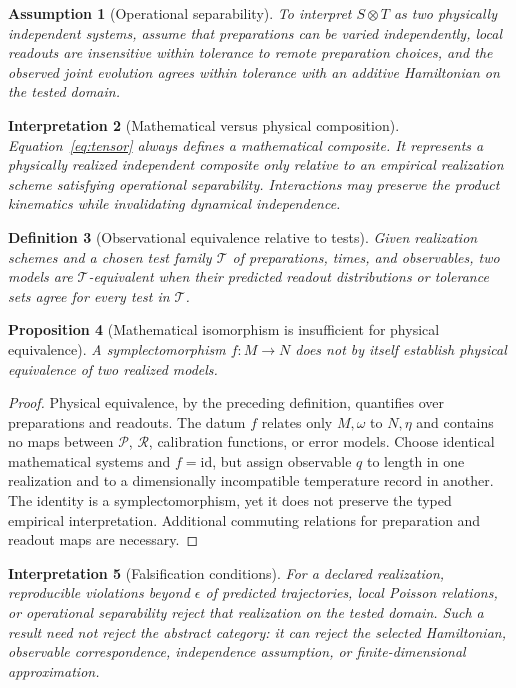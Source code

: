\documentclass[11pt]{article}
\newtheorem{definition}{Definition}[section]
\newtheorem{assumption}[definition]{Assumption}
\newtheorem{proposition}[definition]{Proposition}
\newtheorem{interpretation}[definition]{Interpretation}
\newcommand{\id}{\mathrm{id}}
\begin{document}
\begin{assumption}[Operational separability]
To interpret $S\otimes T$ as two physically independent systems, assume that preparations can be varied independently, local readouts are insensitive within tolerance to remote preparation choices, and the observed joint evolution agrees within tolerance with an additive Hamiltonian on the tested domain.
\end{assumption}

\begin{interpretation}[Mathematical versus physical composition]
Equation~\eqref{eq:tensor} always defines a mathematical composite.  It represents a physically realized independent composite only relative to an empirical realization scheme satisfying operational separability.  Interactions may preserve the product kinematics while invalidating dynamical independence.
\end{interpretation}

\begin{definition}[Observational equivalence relative to tests]
Given realization schemes and a chosen test family $\mathcal T$ of preparations, times, and observables, two models are $\mathcal T$-equivalent when their predicted readout distributions or tolerance sets agree for every test in $\mathcal T$.
\end{definition}

\begin{proposition}[Mathematical isomorphism is insufficient for physical equivalence]
A symplectomorphism $f:M\to N$ does not by itself establish physical equivalence of two realized models.
\end{proposition}
\begin{proof}
Physical equivalence, by the preceding definition, quantifies over preparations and readouts.  The datum $f$ relates only $M,\omega$ to $N,\eta$ and contains no maps between $\mathcal P$, $\mathcal R$, calibration functions, or error models.  Choose identical mathematical systems and $f=\id$, but assign observable $q$ to length in one realization and to a dimensionally incompatible temperature record in another.  The identity is a symplectomorphism, yet it does not preserve the typed empirical interpretation.  Additional commuting relations for preparation and readout maps are necessary.
\end{proof}

\begin{interpretation}[Falsification conditions]
For a declared realization, reproducible violations beyond $\epsilon$ of predicted trajectories, local Poisson relations, or operational separability reject that realization on the tested domain.  Such a result need not reject the abstract category: it can reject the selected Hamiltonian, observable correspondence, independence assumption, or finite-dimensional approximation.
\end{interpretation}
\end{document}
